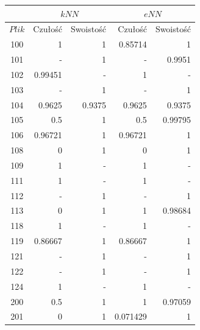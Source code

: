 \begin{table}[H]
	\centering
	\begin{tabular}{|c|r|r|r|r|}
		\hline
		& \multicolumn{2}{c|}{$kNN$} & \multicolumn{2}{c|}{$eNN$} \\
		\hline
		$Plik$ & Czułość & Swoistość & Czułość & Swoistość \\
		\hline
100 &1 &1 &0.85714 &1\\                  
\hline                                   
101 &- &1 &- &0.9951\\               
\hline                                   
102 &0.99451 &- &1 &-\\              
\hline                                   
103 &- &1 &- &1\\                    
\hline                                   
104 &0.9625 &0.9375 &0.9625 &0.9375\\    
\hline                                   
105 &0.5 &1 &0.5 &0.99795\\              
\hline                                   
106 &0.96721 &1 &0.96721 &1\\            
\hline                                   
108 &0 &1 &0 &1\\                        
\hline                                   
109 &1 &- &1 &-\\                    
\hline                                   
111 &1 &- &1 &-\\                    
\hline                                   
112 &- &1 &- &1\\                    
\hline                                   
113 &0 &1 &1 &0.98684\\                  
\hline                                   
118 &1 &- &1 &-\\                    
\hline                                   
119 &0.86667 &1 &0.86667 &1\\            
\hline                                   
121 &- &1 &- &1\\                    
\hline                                   
122 &- &1 &- &1\\                    
\hline                                   
124 &1 &- &1 &-\\                    
\hline                                   
200 &0.5 &1 &1 &0.97059\\                
\hline                                   
201 &0 &1 &0.071429 &1\\                 

\end{tabular}
\end{table}
